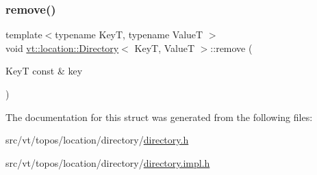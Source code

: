 \mbox{\label{structvt_1_1location_1_1_directory_a85c59bd87eecbfabcbd7941e1c1929ae}} 
\subsubsection{\texorpdfstring{remove()}{remove()}}
{\footnotesize\ttfamily template$<$typename KeyT, typename ValueT $>$ \\
void \hyperlink{structvt_1_1location_1_1_directory}{vt\+::location\+::\+Directory}$<$ KeyT, ValueT $>$\+::remove (\begin{DoxyParamCaption}\item[{KeyT const \&}]{key }\end{DoxyParamCaption})}



The documentation for this struct was generated from the following files\+:\begin{DoxyCompactItemize}
\item 
src/vt/topos/location/directory/\hyperlink{directory_8h}{directory.\+h}\item 
src/vt/topos/location/directory/\hyperlink{directory_8impl_8h}{directory.\+impl.\+h}\end{DoxyCompactItemize}
